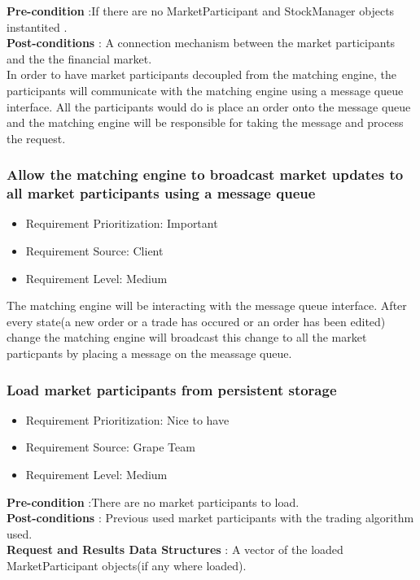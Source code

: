 \documentclass[12pt]{article}
\begin{document}
			\textbf{Pre-condition} :If there are no MarketParticipant and StockManager objects instantited  .\\
			\textbf{Post-conditions} : A connection mechanism between the market participants and the the financial market.\\ 
						
			In order to have market participants decoupled from the matching engine,  the participants will communicate with the matching engine using a message queue interface. All the participants would do is place an order onto the message queue and the matching engine will be responsible for taking the message and process the request.
			
			\subsubsection{Allow the matching engine to broadcast market updates to all market participants using a message queue}
			\begin{itemize}
				\item Requirement Prioritization: Important
				\item Requirement Source: Client 
				\item Requirement Level: Medium	
			\end{itemize}
			The matching engine will be interacting with the message queue interface. After every state(a new order or a trade has occured or an order has been edited) change the matching engine will broadcast this change to all the market particpants by placing a message on the meassage queue.
			
			\subsubsection{Load market participants from persistent storage}
			\begin{itemize}
				\item Requirement Prioritization: Nice to have
				\item Requirement Source: Grape Team 
				\item Requirement Level: Medium	
			\end{itemize}
			\textbf{Pre-condition} :There are no market participants to load.\\
			\textbf{Post-conditions} : Previous used market participants with the trading algorithm used.\\ 
			\textbf{Request and Results Data Structures} : A vector of the loaded MarketParticipant objects(if any where loaded).\\
						
\end{document}

